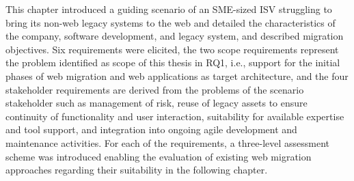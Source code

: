 This chapter introduced a guiding scenario of an SME-sized ISV struggling to bring its non-web legacy systems to the web and detailed the characteristics of the company, software development, and legacy system, and described migration objectives.
Six requirements were elicited, the two scope requirements represent the problem identified as scope of this thesis in RQ1, i.e., support for the initial phases of web migration and web applications as target architecture, and the four stakeholder requirements are derived from the problems of the scenario stakeholder such as management of risk, reuse of legacy assets to ensure continuity of functionality and user interaction, suitability for available expertise and tool support, and integration into ongoing agile development and maintenance activities.
For each of the requirements, a three-level assessment scheme was introduced enabling the evaluation of existing web migration approaches regarding their suitability in the following chapter.
